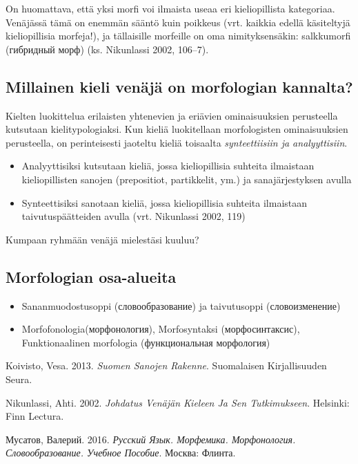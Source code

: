 \documentclass[]{scrartcl}
\providecommand{\tightlist}{%
  \setlength{\itemsep}{0pt}\setlength{\parskip}{0pt}}
\begin{document}
On huomattava, että yksi morfi voi ilmaista useaa eri kieliopillista
kategoriaa. Venäjässä tämä on enemmän sääntö kuin poikkeus (vrt. kaikkia
edellä käsiteltyjä kieliopillisia morfeja!), ja tällaisille morfeille on
oma nimityksensäkin: salkkumorfi (гибридный морф) (ks. Nikunlassi 2002,
106--7).

\subsection{Millainen kieli venäjä on morfologian
kannalta?}\label{millainen-kieli-venuxe4juxe4-on-morfologian-kannalta}

Kielten luokittelua erilaisten yhtenevien ja eriävien ominaisuuksien
perusteella kutsutaan kielitypologiaksi. Kun kieliä luokitellaan
morfologisten ominaisuuksien perusteella, on perinteisesti jaoteltu
kieliä toisaalta \emph{synteettiisiin ja analyyttisiin}.

\begin{itemize}
\tightlist
\item
  Analyyttisiksi kutsutaan kieliä, jossa kieliopillisia suhteita
  ilmaistaan kieliopillisten sanojen (prepositiot, partikkelit, ym.) ja
  sanajärjestyksen avulla
\item
  Synteettisiksi sanotaan kieliä, jossa kieliopillisia suhteita
  ilmaistaan taivutuspäätteiden avulla (vrt. Nikunlassi 2002, 119)
\end{itemize}

Kumpaan ryhmään venäjä mielestäsi kuuluu?

\subsection{Morfologian osa-alueita}\label{morfologian-osa-alueita}

\begin{itemize}
\item
  Sananmuodostusoppi (словообразование) ja taivutusoppi (словоизменение)
\item
  Morfofonologia(морфонология), Morfosyntaksi (морфосинтаксис),
  Funktionaalinen morfologia (функциональная морфология)
\end{itemize}

Koivisto, Vesa. 2013. \emph{Suomen Sanojen Rakenne}. Suomalaisen
Kirjallisuuden Seura.

Nikunlassi, Ahti. 2002. \emph{Johdatus Venäjän Kieleen Ja Sen
Tutkimukseen}. Helsinki: Finn Lectura.

Мусатов, Валерий. 2016. \emph{Русский Язык. Морфемика. Морфонология.
Словообразование. Учебное Пособие}. Москва: Флинта.
\end{document}
